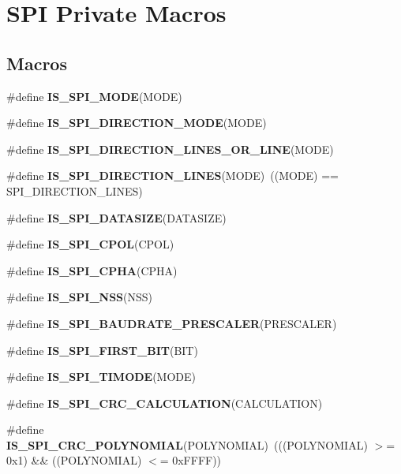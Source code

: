 \hypertarget{group___s_p_i___private___macros}{}\section{S\+PI Private Macros}
\label{group___s_p_i___private___macros}
\subsection*{Macros}
\begin{DoxyCompactItemize}
\item 
\#define {\bfseries I\+S\+\_\+\+S\+P\+I\+\_\+\+M\+O\+DE}(M\+O\+DE)
\item 
\#define {\bfseries I\+S\+\_\+\+S\+P\+I\+\_\+\+D\+I\+R\+E\+C\+T\+I\+O\+N\+\_\+\+M\+O\+DE}(M\+O\+DE)
\item 
\#define {\bfseries I\+S\+\_\+\+S\+P\+I\+\_\+\+D\+I\+R\+E\+C\+T\+I\+O\+N\+\_\+L\+I\+N\+E\+S\+\_\+\+O\+R\+\_\+L\+I\+NE}(M\+O\+DE)
\item 
\#define {\bfseries I\+S\+\_\+\+S\+P\+I\+\_\+\+D\+I\+R\+E\+C\+T\+I\+O\+N\+\_\+L\+I\+N\+ES}(M\+O\+DE)~((M\+O\+DE) == S\+P\+I\+\_\+\+D\+I\+R\+E\+C\+T\+I\+O\+N\+\_\+L\+I\+N\+ES)\hypertarget{group___s_p_i___private___macros_ga79454622381b22d02c8cdd3346c80f78}{}\label{group___s_p_i___private___macros_ga79454622381b22d02c8cdd3346c80f78}

\item 
\#define {\bfseries I\+S\+\_\+\+S\+P\+I\+\_\+\+D\+A\+T\+A\+S\+I\+ZE}(D\+A\+T\+A\+S\+I\+ZE)
\item 
\#define {\bfseries I\+S\+\_\+\+S\+P\+I\+\_\+\+C\+P\+OL}(C\+P\+OL)
\item 
\#define {\bfseries I\+S\+\_\+\+S\+P\+I\+\_\+\+C\+P\+HA}(C\+P\+HA)
\item 
\#define {\bfseries I\+S\+\_\+\+S\+P\+I\+\_\+\+N\+SS}(N\+SS)
\item 
\#define {\bfseries I\+S\+\_\+\+S\+P\+I\+\_\+\+B\+A\+U\+D\+R\+A\+T\+E\+\_\+\+P\+R\+E\+S\+C\+A\+L\+ER}(P\+R\+E\+S\+C\+A\+L\+ER)
\item 
\#define {\bfseries I\+S\+\_\+\+S\+P\+I\+\_\+\+F\+I\+R\+S\+T\+\_\+\+B\+IT}(B\+IT)
\item 
\#define {\bfseries I\+S\+\_\+\+S\+P\+I\+\_\+\+T\+I\+M\+O\+DE}(M\+O\+DE)
\item 
\#define {\bfseries I\+S\+\_\+\+S\+P\+I\+\_\+\+C\+R\+C\+\_\+\+C\+A\+L\+C\+U\+L\+A\+T\+I\+ON}(C\+A\+L\+C\+U\+L\+A\+T\+I\+ON)
\item 
\#define {\bfseries I\+S\+\_\+\+S\+P\+I\+\_\+\+C\+R\+C\+\_\+\+P\+O\+L\+Y\+N\+O\+M\+I\+AL}(P\+O\+L\+Y\+N\+O\+M\+I\+AL)~(((P\+O\+L\+Y\+N\+O\+M\+I\+AL) $>$= 0x1) \&\& ((\+P\+O\+L\+Y\+N\+O\+M\+I\+A\+L) $<$= 0x\+F\+F\+F\+F))\hypertarget{group___s_p_i___private___macros_ga76eec5bbb44c873aa52966a9cb6c8f8c}{}\label{group___s_p_i___private___macros_ga76eec5bbb44c873aa52966a9cb6c8f8c}


\end{DoxyCompactItemize}
